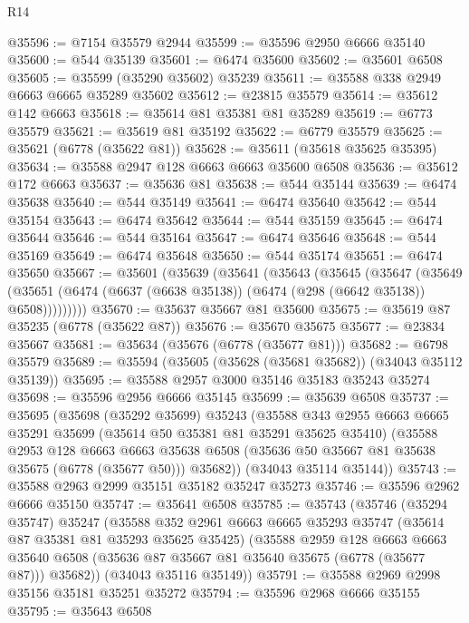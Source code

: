 \begin{lexlean}{R14}
\begin{coremodule}
@35596 := @7154 @35579 @2944
@35599 := @35596 @2950 @6666 @35140
@35600 := @544 @35139
@35601 := @6474 @35600
@35602 := @35601 @6508
@35605 := @35599 (@35290 @35602) @35239
@35611 := @35588 @338 @2949 @6663 @6665 @35289 @35602
@35612 := @23815 @35579
@35614 := @35612 @142 @6663
@35618 := @35614 @81 @35381 @81 @35289
@35619 := @6773 @35579
@35621 := @35619 @81 @35192
@35622 := @6779 @35579
@35625 := @35621 (@6778 (@35622 @81))
@35628 := @35611 (@35618 @35625 @35395)
@35634 := @35588 @2947 @128 @6663 @6663 @35600 @6508
@35636 := @35612 @172 @6663
@35637 := @35636 @81
@35638 := @544 @35144
@35639 := @6474 @35638
@35640 := @544 @35149
@35641 := @6474 @35640
@35642 := @544 @35154
@35643 := @6474 @35642
@35644 := @544 @35159
@35645 := @6474 @35644
@35646 := @544 @35164
@35647 := @6474 @35646
@35648 := @544 @35169
@35649 := @6474 @35648
@35650 := @544 @35174
@35651 := @6474 @35650
@35667 := @35601
    (@35639
      (@35641
        (@35643
          (@35645
            (@35647
              (@35649
                (@35651 (@6474 (@6637 (@6638 @35138)) (@6474 (@298 (@6642 @35138)) @6508)))))))))
@35670 := @35637 @35667 @81 @35600
@35675 := @35619 @87 @35235 (@6778 (@35622 @87))
@35676 := @35670 @35675
@35677 := @23834 @35667
@35681 := @35634 (@35676 (@6778 (@35677 @81)))
@35682 := @6798 @35579
@35689 := @35594 (@35605 (@35628 (@35681 @35682)) (@34043 @35112 @35139))
@35695 := @35588 @2957 @3000 @35146 @35183 @35243 @35274
@35698 := @35596 @2956 @6666 @35145
@35699 := @35639 @6508
@35737 := @35695
    (@35698
      (@35292 @35699)
      @35243
      (@35588
        @343
        @2955
        @6663
        @6665
        @35291
        @35699
        (@35614 @50 @35381 @81 @35291 @35625 @35410)
        (@35588
          @2953
          @128
          @6663
          @6663
          @35638
          @6508
          (@35636 @50 @35667 @81 @35638 @35675 (@6778 (@35677 @50)))
          @35682))
      (@34043 @35114 @35144))
@35743 := @35588 @2963 @2999 @35151 @35182 @35247 @35273
@35746 := @35596 @2962 @6666 @35150
@35747 := @35641 @6508
@35785 := @35743
    (@35746
      (@35294 @35747)
      @35247
      (@35588
        @352
        @2961
        @6663
        @6665
        @35293
        @35747
        (@35614 @87 @35381 @81 @35293 @35625 @35425)
        (@35588
          @2959
          @128
          @6663
          @6663
          @35640
          @6508
          (@35636 @87 @35667 @81 @35640 @35675 (@6778 (@35677 @87)))
          @35682))
      (@34043 @35116 @35149))
@35791 := @35588 @2969 @2998 @35156 @35181 @35251 @35272
@35794 := @35596 @2968 @6666 @35155
@35795 := @35643 @6508

\end{coremodule}
\end{lexlean}
